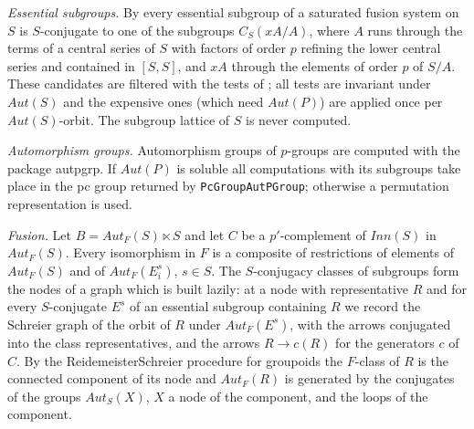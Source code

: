 \documentclass[a4paper,11pt]{report}
\begin{document}
{{ \emph{Essential subgroups.} By \cite[Theorem 3.6]{Gau26} every essential subgroup of a saturated fusion system on $S$ is $S$-conjugate to one of the subgroups $C_S(xA/A)$, where $A$ runs through the terms of a central series of $S$ with factors of order $p$ refining the lower central series and contained in $[S,S]$, and $xA$ through the elements of order $p$ of $S/A$. These candidates are filtered with the tests of \cite{PS21}; all tests are invariant under $Aut(S)$ and the expensive ones (which need $Aut(P)$) are applied once per $Aut(S)$-orbit. The subgroup lattice of $S$ is never computed. 

 \emph{Automorphism groups.} Automorphism groups of $p$-groups are computed with the package \textsf{autpgrp}. If $Aut(P)$ is soluble all computations with its subgroups take place in the pc group
returned by \texttt{PcGroupAutPGroup}; otherwise a permutation representation is used. 

 \emph{Fusion.} Let $B = Aut_F(S) \ltimes S$ and let $C$ be a $p'$-complement of $Inn(S)$ in $Aut_F(S)$. Every isomorphism in $F$ is a composite of restrictions of elements of $Aut_F(S)$ and of $Aut_F(E_i^s)$, $s \in S$. The $S$-conjugacy classes of subgroups form the nodes of a graph which is built
lazily: at a node with representative $R$ and for every $S$-conjugate $E^s$ of an essential subgroup containing $R$ we record the Schreier graph of the orbit of $R$ under $Aut_F(E^s)$, with the arrows conjugated into the class representatives, and the arrows $R \to c(R)$ for the generators $c$ of $C$. By the Reidemeister{\textendash}Schreier procedure for groupoids the $F$-class of $R$ is the connected component of its node and $Aut_F(R)$ is generated by the conjugates of the groups $Aut_S(X)$, $X$ a node of the component, and the loops of the component. 

}}
\end{document}
